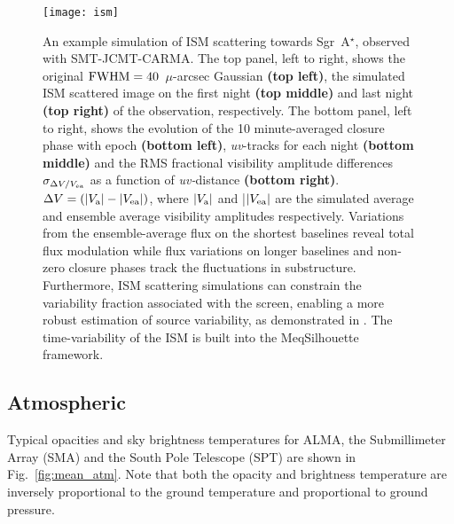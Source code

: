 {\begin{figure}
\begin{center}
\texttt{[image: ism]}
\caption{An example simulation of ISM scattering towards Sgr~A$^{\star}$, observed with SMT-JCMT-CARMA.  The top panel, left to right, shows the original $\rm FWHM = 40$~$\mu$-arcsec Gaussian {\bf (top left)}, the simulated ISM scattered image on the first night {\bf (top middle)} and last night {\bf (top right)} of the observation, respectively.  The bottom panel, left to right,  shows the evolution of the 10 minute-averaged closure phase with epoch {\bf (bottom left)}, {\sl uv}-tracks for each night {\bf (bottom middle)} and the RMS fractional visibility amplitude differences $\sigma_{\Delta V /V_{\rm ea}}$ as a function of {\sl uv-}distance {\bf (bottom right)}. $ \Delta V= (|V_{\rm a}|-|V_{\rm ea}|)$, where $|V_{\rm a}|$ and |$|V_{\rm ea}|$ are the simulated average and ensemble average visibility amplitudes respectively. Variations from the ensemble-average flux on the shortest baselines reveal total flux modulation while flux variations on longer baselines and non-zero closure phases track the fluctuations in substructure.  Furthermore, ISM scattering simulations can constrain the variability fraction associated with the screen, enabling a more robust estimation of source variability, as demonstrated in \citet{2016arXiv160106571O}. The time-variability of the ISM is built into the {\sc MeqSilhouette} framework.\label{ISM_sequence}%
}
\end{center}
\end{figure}

\subsection{Atmospheric}

Typical opacities and sky brightness temperatures for ALMA, the Submillimeter Array (SMA) and the South Pole Telescope (SPT)  are shown in Fig.~\ref{fig:mean_atm}.  Note that both the opacity and brightness temperature are inversely proportional to the ground temperature and proportional to ground pressure.

}
